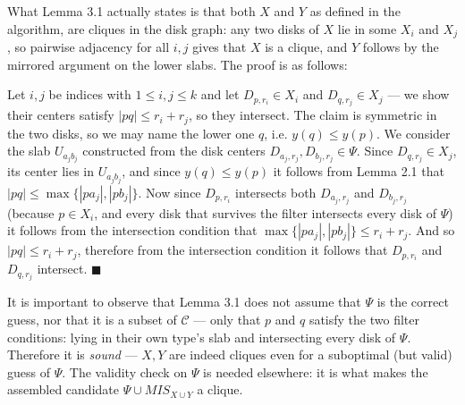 \documentclass[12pt]{article}
\begin{document}
What Lemma 3.1 actually states is that both $X$ and $Y$ as defined in the algorithm, are cliques in the disk graph:
any two disks of $X$ lie in some $X_i$ and $X_j$, so pairwise adjacency for all $i, j$ gives that $X$ is a clique, and $Y$ follows by the mirrored argument on the lower slabs.
The proof is as follows:
 
Let $i, j$ be indices with $1 \leq i, j \leq k$ and let $D_{p,r_i} \in X_i$ and $D_{q,r_j} \in X_j$ --- we show their centers satisfy $|pq| \leq r_i + r_j$, so they intersect.
The claim is symmetric in the two disks, so we may name the lower one $q$, i.e. $y(q) \leq y(p)$.
We consider the slab $U_{a_jb_j}$ constructed from the disk centers $D_{a_j, r_j}, D_{b_j, r_j} \in \Psi$.
Since $D_{q,r_j} \in X_j$, its center lies in $U_{a_jb_j}$, and since $y(q) \leq y(p)$ it follows from Lemma 2.1 that $|pq| \leq \max\{|pa_j|, |pb_j|\}$.
Now since $D_{p,r_i}$ intersects both $D_{a_j, r_j}$ and $D_{b_j, r_j}$ (because $p \in X_i$, and every disk that survives the filter intersects every disk of $\Psi$) it follows from the intersection condition that $\max\{|pa_j|, |pb_j|\} \leq r_i + r_j$.
And so $|pq| \leq r_i + r_j$, therefore from the intersection condition it follows that $D_{p,r_i}$ and $D_{q,r_j}$ intersect. $\blacksquare$
 
It is important to observe that Lemma 3.1 does not assume that $\Psi$ is the correct guess, nor that it is a subset of $\mathcal{C}$ --- only that $p$ and $q$ satisfy the two filter conditions: lying in their own type's slab and intersecting every disk of $\Psi$.
Therefore it is \textit{sound} --- $X, Y$ are indeed cliques even for a suboptimal (but valid) guess of $\Psi$.
The validity check on $\Psi$ is needed elsewhere: it is what makes the assembled candidate $\Psi \cup MIS_{X \cup Y}$ a clique.
 
\end{document}
